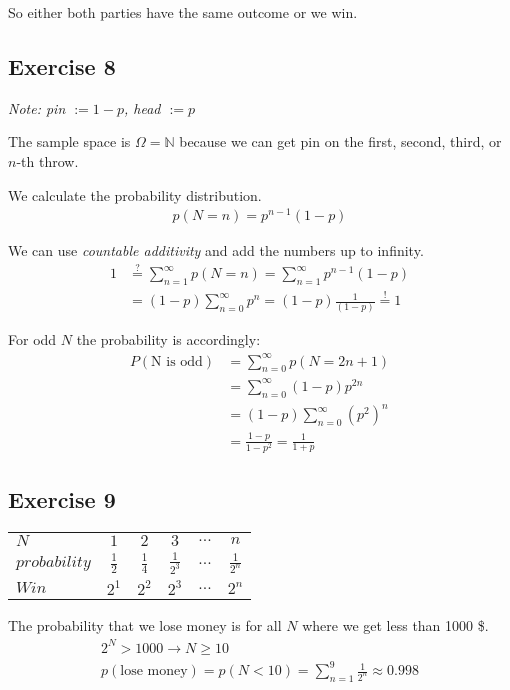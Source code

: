 So either both parties have the same outcome or we win.

\subsection*{Exercise 8}
\textit{Note: pin $:= 1-p$, head $:= p$}

The sample space is $\Omega = \mathbb{N}$ because we can get pin on the first, second, third, or $n$-th throw.

We calculate the probability distribution.
\begin{align*}
p(N = n) = p^{n - 1} \left( 1 - p \right)
\end{align*}

We can use \textit{countable additivity} and add the numbers up to infinity.
\begin{align*}
1 &\stackrel{?}{=} \sum\limits_{n = 1}^\infty p(N = n) = \sum\limits_{n = 1}^\infty p^{n - 1}\left( 1 - p \right) \\
&= \left( 1 - p \right) \sum\limits_{n=0}^\infty p^n = \left( 1 - p \right) \frac{1}{\left( 1 - p \right)} \stackrel{!}{=} 1
\end{align*}

For odd $N$ the probability is accordingly:
\begin{align*}
P\left(\mbox{N is odd}\right) &= \sum\limits_{n=0}^\infty p(N=2n+1)\\
&= \sum\limits_{n=0}^\infty \left( 1 - p \right) p^{2n} \\
&= \left( 1 - p \right) \sum\limits_{n=0}^\infty \left(p^2\right)^n \\
&= \frac{1-p}{1-p^2} = \frac{1}{1+p}
\end{align*}

\subsection*{Exercise 9}
\begin{tabular}{ l || c | c | c | c | c }
  $N$           & $1$ & $2$ & $3$ & $...$ & $n$ \\
  $probability$ & $\frac{1}{2}$ & $\frac{1}{4}$ & $\frac{1}{2^3}$ & $...$ & $\frac{1}{2^n}$ \\
  $Win$         & $2^1$ & $2^2$ & $2^3$ & $...$ & $2^n$ \\
\end{tabular}

The probability that we lose money is for all $N$ where we get less than 1000 \$.
\begin{align*}
2^N > 1000 \rightarrow N \geq 10 \\
p\left(\mbox{lose money}\right) = p(N<10) = \sum\limits_{n=1}^9 \frac{1}{2^n} \approx 0.998
\end{align*}

